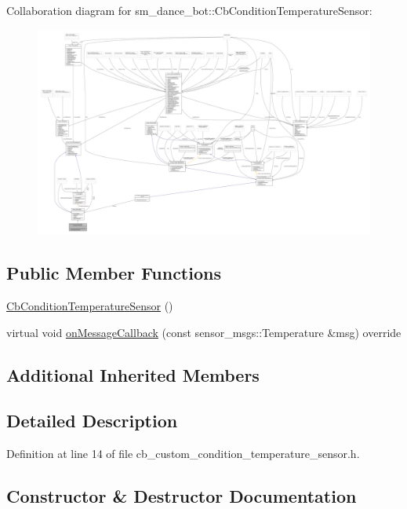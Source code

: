 Collaboration diagram for sm\+\_\+dance\+\_\+bot\+:\+:Cb\+Condition\+Temperature\+Sensor\+:
\nopagebreak
\begin{figure}[H]
\begin{center}
\leavevmode
\includegraphics[width=350pt]{classsm__dance__bot_1_1CbConditionTemperatureSensor__coll__graph}
\end{center}
\end{figure}
\subsection*{Public Member Functions}
\begin{DoxyCompactItemize}
\item 
\hyperlink{classsm__dance__bot_1_1CbConditionTemperatureSensor_a379f1d3f90bbaffef80c680f54859838}{Cb\+Condition\+Temperature\+Sensor} ()
\item 
virtual void \hyperlink{classsm__dance__bot_1_1CbConditionTemperatureSensor_af3865e6af4f9ddd41dc3ec3bbae46555}{on\+Message\+Callback} (const sensor\+\_\+msgs\+::\+Temperature \&msg) override
\end{DoxyCompactItemize}
\subsection*{Additional Inherited Members}


\subsection{Detailed Description}


Definition at line 14 of file cb\+\_\+custom\+\_\+condition\+\_\+temperature\+\_\+sensor.\+h.



\subsection{Constructor \& Destructor Documentation}

